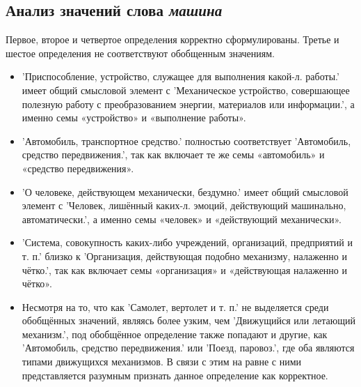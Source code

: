 \subsection*{Анализ значений слова \textit{машина}}

Первое, второе и четвертое определения корректно сформулированы.
Третье и шестое определения не соответствуют обобщенным значениям.

\begin{itemize}
    \item ’Приспособление, устройство, служащее для выполнения какой-л. работы.’ имеет общий смысловой элемент с
’Механическое устройство, совершающее полезную работу с преобразованием энергии, материалов или информации.’,
а именно семы «устройство» и «выполнение работы».

    \item ’Автомобиль, транспортное средство.’ полностью соответствует
’Автомобиль, средство передвижения.’, так как включает те же семы «автомобиль» и «средство передвижения».

    \item ’О человеке, действующем механически, бездумно.’ имеет общий смысловой элемент с
’Человек, лишённый каких-л. эмоций, действующий машинально, автоматически.’,
а именно семы «человек» и «действующий механически».

    \item ’Система, совокупность каких-либо учреждений, организаций, предприятий и т. п.’ близко к
’Организация, действующая подобно механизму, налаженно и чётко.’,
так как включает семы «организация» и «действующая налаженно и чётко».
\end{itemize}

\begin{itemize}
    \item Несмотря на то, что как ’Самолет, вертолет и т. п.’ не выделяется среди
обобщённых значений, являясь более узким, чем ’Движущийся или летающий механизм.’,
под обобщённое определение также попадают и другие, как ’Автомобиль, средство передвижения.’
или ’Поезд, паровоз.’, где оба являются типами движущихся механизмов.
В связи с этим на равне с ними представляется разумным признать данное определение как корректное.

\end{itemize}

